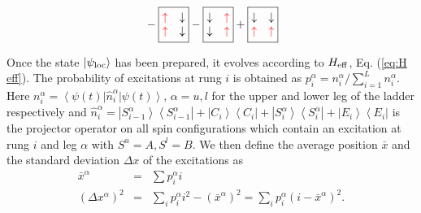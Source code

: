\documentclass[prl,aps,twocolumn,showpacs,superscriptaddress,longbibliography]{revtex4-1}
\newcommand{\lan}{\left\langle}
\newcommand{\ran}{\right\rangle}
\newcommand{\ket}[1]{\left| #1 \ran}
\newcommand{\bra}[1]{\lan #1 \right|}
\begin{document}
\begin{eqnarray}
{}
-
\boxed{
\begin{matrix}
  {\color{red} \uparrow} & \downarrow \\
  {\color{red} \uparrow} & \downarrow
 \end{matrix}
}
-
\boxed{
\begin{matrix}
  \downarrow & {\color{red} \uparrow} \\
  \downarrow & {\color{red} \uparrow}
 \end{matrix}
}
+
\boxed{
\begin{matrix}
  \downarrow & \downarrow \\
  {\color{red} \uparrow} & {\color{red} \uparrow}
 \end{matrix}
} \nonumber \\
%
\label{eq:preparation}
\end{eqnarray}

Once the state $\ket{\psi_{\rm loc}}$ has been prepared, it evolves according to $H_{\rm eff}$, Eq. (\ref{eq:H eff}). The probability of excitations at rung $i$ is obtained as $p^\alpha_i = n^\alpha_i/\sum_{i=1}^{L} n^\alpha_i$. Here $n^\alpha_i = \bra{\psi(t)} \hat{n}^\alpha_i \ket{\psi(t)}$, $\alpha=u,l$ for the upper and lower leg of the ladder respectively and $\hat{n}^\alpha_i = \ket{S^\alpha_{i-1}}\bra{S^\alpha_{i-1}} + \ket{C_{i}}\bra{C_{i}} + \ket{S^\alpha_{i}}\bra{S^\alpha_{i}} + \ket{E_{i}}\bra{E_{i}}$ is the projector operator on all spin configurations which contain an excitation at rung $i$ and leg $\alpha$ with $S^u=A, S^l=B$.
We then define the average position $\bar{x}$ and the standard deviation $\Delta x$ of the excitations as
\begin{eqnarray}
	\bar{x}^\alpha &=& \sum p^\alpha_i i \\
	\left( \Delta x^\alpha \right)^2 &=& \sum_i p^\alpha_i i^2 - \left(\bar{x}^\alpha \right)^2 = \sum_i p^\alpha_i (i-\bar{x}^\alpha)^2.
	\label{eq:Delta x}
\end{eqnarray}
\end{document}
